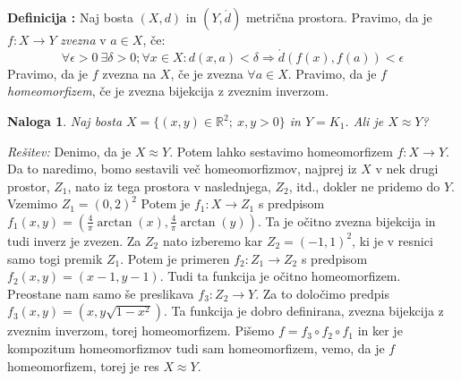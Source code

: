\documentclass[a4paper, 10pt]{article}
\newtheorem{nal}{Naloga}
\newcounter{defcount}
\newenvironment{definicija}{\begin{flushleft}\stepcounter{defcount}\textbf{Definicija \arabic{defcount}:}}{\hfill\end{flushleft}}
\newenvironment{resitev}{\begin{flushleft}\textit{Rešitev:}}{\hfill\end{flushleft}}
\newcommand{\mth}[1]{\ensuremath{\mathbb{#1}}}
\newcommand{\R}{\mth{R}}
\newcommand{\pojem}[1]{\emph{#1}}
\newcommand{\map}[3]{\ensuremath{{#1}: {#2} \rightarrow {#3}}}
\begin{document}
	\begin{definicija}
		Naj bosta $(X, d)$ in $(Y, \acute{d})$ metrična prostora. Pravimo, da je $\map{f}{X}{Y}$ \pojem{zvezna} v $a\in X$, če: $$\forall\epsilon>0~\exists\delta>0; \forall x\in X: d(x, a) < \delta \Rightarrow \acute{d}(f(x), f(a))< \epsilon$$
		Pravimo, da je $f$ zvezna na $X$, če je zvezna $\forall a\in X$. Pravimo, da je $f$ \pojem{homeomorfizem}, če je zvezna bijekcija z zveznim inverzom.
	\end{definicija}
	\begin{nal}
		Naj bosta $X = \{(x, y)\in \R^2;~x, y > 0\}$ in $Y = K_1$. Ali je $X\approx Y$?
	\end{nal}
	\begin{resitev}
		Denimo, da je $X\approx Y$. Potem lahko sestavimo homeomorfizem $\map{f}{X}{Y}$. Da to naredimo, bomo sestavili več homeomorfizmov, najprej iz $X$ v nek drugi prostor, $Z_1$, nato iz tega prostora v naslednjega, $Z_2$, itd., dokler ne pridemo do $Y$.
		Vzemimo $Z_1 = (0, 2)^2$ Potem je $\map{f_1}{X}{Z_1}$ s predpisom $f_1(x, y) = (\frac{4}{\pi}\arctan(x), \frac{4}{\pi}\arctan(y))$. Ta je očitno zvezna bijekcija in tudi inverz je zvezen. Za $Z_2$ nato izberemo kar $Z_2 = (-1, 1)^2$, ki je v resnici samo togi premik $Z_1$. Potem je primeren $\map{f_2}{Z_1}{Z_2}$ s predpisom $f_2(x, y) = (x-1, y-1)$. Tudi ta funkcija je očitno homeomorfizem. Preostane nam samo še preslikava $\map{f_3}{Z_2}{Y}$. Za to določimo predpis $f_3(x, y) = (x, y\sqrt{1-x^2})$. Ta funkcija je dobro definirana, zvezna bijekcija z zveznim inverzom, torej homeomorfizem. Pišemo $f = f_3\circ f_2\circ f_1$ in ker je kompozitum homeomorfizmov tudi sam homeomorfizem, vemo, da je $f$ homeomorfizem, torej je res $X\approx Y$.
	\end{resitev}
\end{document}
